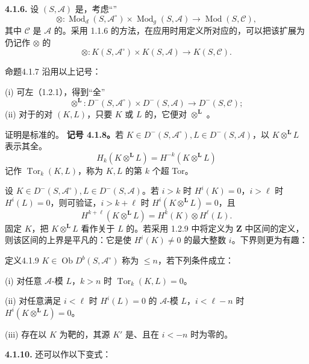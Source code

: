 \textbf{4.1.6.} 设 $(S,\mathscr A)$ 是，考虑“”
\[\otimes:\operatorname{Mod}_d(S,\mathscr A^\circ)\times\operatorname{Mod}_g(S,\mathscr A)\longrightarrow\operatorname{Mod}(S,\mathscr C),\]
其中 $\mathscr C$ 是 $\mathscr A$ 的。采用 1.1.6 的方法，在应用时用定义所对应的，可以把该扩展为仍记作 $\otimes$ 的
\[\otimes:K(S,\mathscr A^\circ)\times K(S,\mathscr A)\longrightarrow K(S,\mathscr C).\]
\begin{SGAresult}{命题}{4.1.7}
沿用以上记号：

(i) 可左（1.2.1），得到“全”
\[\mathbin{\otimes^{\mathbf L}}:D^-(S,\mathscr A^\circ)\times D^-(S,\mathscr A)\longrightarrow D^-(S,\mathscr C);\]
(ii) 对于的对 $(K,L)$，只要 $K$ 或 $L$ 的，它便对 $\otimes^{\mathbf L}$ 。
\end{SGAresult}
证明是标准的。
\textbf{记号 4.1.8。}若 $K\in D^-(S,\mathscr A^\circ),L\in D^-(S,\mathscr A)$，以 $K\otimes^{\mathbf L}L$ 表示其全。
\[H_k(K\otimes^{\mathbf L}L)=H^{-k}(K\otimes^{\mathbf L}L)\]
记作 $\operatorname{Tor}_k(K,L)$，称为 $K,L$ 的第 $k$ 个超 Tor。

设 $K\in D^-(S,\mathscr A^\circ),L\in D^-(S,\mathscr A)$。若 $i>k$ 时 $H^i(K)=0$，$i>\ell$ 时 $H^i(L)=0$，则可验证，$i>k+\ell$ 时 $H^i(K\otimes^{\mathbf L}L)=0$，且
\[H^{k+\ell}(K\otimes^{\mathbf L}L)=H^k(K)\otimes H^\ell(L).\]
固定 $K$，把 $K\otimes^{\mathbf L}L$ 看作关于 $L$ 的。若采用 1.2.9 中将定义为 $\mathbf Z$ 中区间的定义，则该区间的上界是平凡的：它是使 $H^i(K)\ne0$ 的最大整数 $i$。下界则更为有趣：
\begin{SGAresult}{定义}{4.1.9}
 $K\in\operatorname{Ob}D^b(S,\mathscr A^\circ)$ 称为 $\le n$，若下列条件成立：

(i) 对任意 $\mathscr A$-模 $L$，$k>n$ 时 $\operatorname{Tor}_k(K,L)=0$。

(ii) 对任意满足 $i<\ell$ 时 $H^i(L)=0$ 的 $\mathscr A$-模 $L$，$i<\ell-n$ 时 $H^i(K\otimes^{\mathbf L}L)=0$。

(iii) 存在以 $K$ 为靶的，其源 $K'$ 是、且在 $i<-n$ 时为零的。
\end{SGAresult}
\textbf{4.1.10.} 还可以作以下变式：

